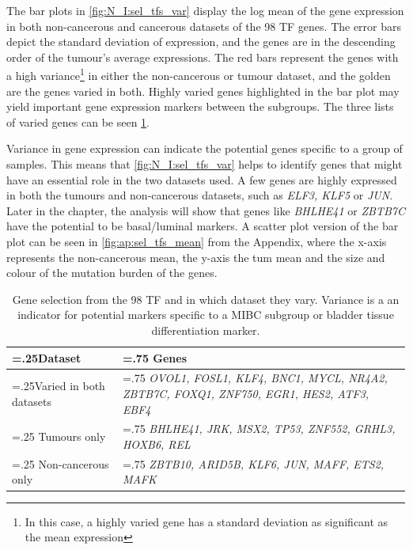The bar plots in \cref{fig:N_I:sel_tfs_var} display the log mean of the gene expression in both non-cancerous and cancerous datasets of the 98 TF genes. The error bars depict the standard deviation of expression, and the genes are in the descending order of the tumour's average expressions. The red bars represent the genes with a high variance\footnote{In this case, a highly varied gene has a standard deviation as significant as the mean expression} in either the non-cancerous or tumour dataset, and the golden are the genes varied in both. Highly varied genes highlighted in the bar plot may yield important gene expression markers between the subgroups. The three lists of varied genes can be seen \cref{tab:N_I:sel_tfs_var}.


Variance in gene expression can indicate the potential genes specific to a group of samples. This means that \cref{fig:N_I:sel_tfs_var} helps to identify genes that might have an essential role in the two datasets used. A few genes are highly expressed in both the tumours and non-cancerous datasets, such as \textit{ELF3, KLF5} or \textit{JUN}. Later in the chapter, the analysis will show that genes like \textit{BHLHE41} or \textit{ZBTB7C} have the potential to be basal/luminal markers. A scatter plot version of the bar plot can be seen in \cref{fig:ap:sel_tfs_mean} from the Appendix, where the x-axis represents the non-cancerous mean, the y-axis the tum mean and the size and colour of the mutation burden of the genes.


\begin{table}[!t]
  \centering
  \small
  \begin{tabularx}{\textwidth}{>{\hsize=.25\hsize}X|>{\hsize=.75\hsize}X}
    \toprule
    \textbf{Dataset} & \textbf{Genes} \\
    \midrule
    Varied in both datasets & \textit{OVOL1, FOSL1, KLF4, BNC1, MYCL, NR4A2, ZBTB7C, FOXQ1, ZNF750, EGR1, HES2, ATF3, EBF4} \\
    \midrule
    Tumours only & \textit{BHLHE41, JRK, MSX2, TP53, ZNF552, GRHL3, HOXB6, REL} \\
    \midrule
    Non-cancerous only & \textit{ZBTB10, ARID5B, KLF6, JUN, MAFF, ETS2, MAFK} \\
    \bottomrule
  \end{tabularx}
    \caption[Summary of the subset of 98 TF which are highly varied]{Gene selection from the 98 TF and in which dataset they vary. Variance is a an indicator for potential markers specific to a MIBC subgroup or bladder tissue differentiation marker.}
    \label{tab:N_I:sel_tfs_var}
\end{table}



